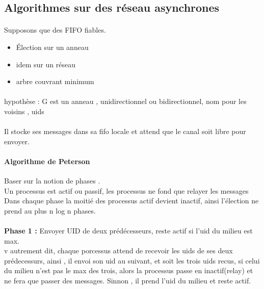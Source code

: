 \documentclass{article}
\begin{document}
\subsection{Algorithmes sur des réseau asynchrones}
\paragraph{}Supposons que des FIFO fiables.
\begin{itemize}
\item Élection sur un anneau
\item idem sur un réseau
\item arbre couvrant minimum
\end{itemize}

\paragraph{} hypothèse : G est un anneau , unidirectionnel ou bidirectionnel, nom pour les voisins , uids\\\\ Il stocke ses messages dans sa fifo locale et attend que le canal soit libre pour envoyer.
\paragraph{Algorithme de Peterson} Baser sur la notion de phases . \\ Un processus est actif ou passif, les processus ne fond que relayer les messages\\Dans chaque phase la moitié des processus actif devient inactif, ainsi l’élection ne prend au plus n log n phases.\\\\\textbf{Phase 1 : } Envoyer UID de deux prédécesseurs, reste actif si l'uid du milieu est max.\\v autrement dit, chaque porcessus attend de recevoir les uids de ses deux prédecessurs, ainsi , il envoi son uid au suivant, et soit les trois uids recus, si celui du milieu n'est pas le max des trois, alors la processus passe en inactif(relay) et ne fera que passer des messages. Sinnon , il prend l'uid du milieu  et reste actif.\\
\end{document}
